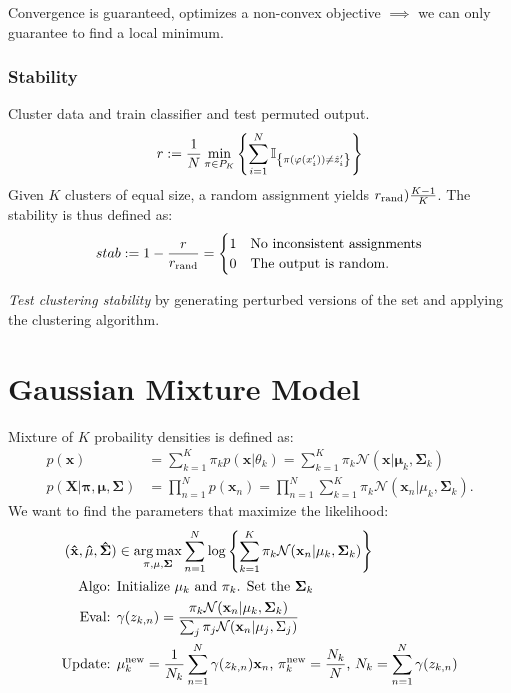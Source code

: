 \documentclass[a4paper,11pt,landscape]{article}
\renewcommand{\phi}{\varphi}
\newcommand{\argmax}{\operatorname*{arg\,max}}
\newcommand{\sectionline}{\noindent\makebox[\linewidth]{\rule{\columnwidth}{0.1pt}}}
\newcommand{\msection}[1]{\vspace{-1mm}\sectionline\vspace{-1mm}\section{#1}\vspace{-1mm}}
\begin{document}
\begin{multicols}{3}
\begin{enumerate}
\end{enumerate}

Convergence is guaranteed, optimizes a non-convex objective $\implies$ we can only guarantee to find a local minimum.

\subsubsection{Stability}
Cluster data and train classifier and test permuted output.
\[
 r := {1 \over N} \min_{\pi \in P_K} \left\{ \sum_{i=1}^N \mathbb{I}_{
    \left\{ \pi (\phi (x_i')) \neq \hat{z}_i' \right\}
  } \right\}
\]
Given $K$ clusters of equal size, a random assignment yields $r_{\text{rand}}) {K-1 \over K}$. The stability is thus defined as:
\[
 stab := 1 - {r \over r_{\text{rand}}} =
  \begin{cases}
   1 & \text{No inconsistent assignments}\\
   0 & \text{The output is random.}
  \end{cases}
\]


\emph{Test clustering stability} by generating perturbed versions of the set and applying the clustering algorithm.
\msection{Gaussian Mixture Model}
Mixture of $K$ probaility densities is defined as:
\begin{align*}
 p(\mathbf x) &= \sum_{k=1}^K \pi_k p(\mathbf x | \theta_k) = \sum_{k=1}^K \pi_k \mathcal N(\mathbf x | \mathbf \mu_k, \mathbf \Sigma_k)\\
 p(\mathbf X | \mathbf \pi, \mathbf\mu, \mathbf\Sigma) &= \prod_{n=1}^N p(\mathbf x_n) = \prod_{n=1}^N \sum_{k=1}^K \pi_k \mathcal N(\mathbf x_n| \mu_k, \mathbf \Sigma_k).
\end{align*}
We want to find the parameters that maximize the likelihood:
\begin{align*}
 (\mathbf{\hat x}, \mathbf{\hat \mu }, \mathbf{\hat \Sigma}) &\in \argmax_{\mathbf \pi, \mathbf \mu, \mathbf \Sigma} \sum_{n=1}^N \log \left\{ \sum_{k=1}^K  \pi_k \mathcal N (\mathbf x_n | \mathbf \mu_k, \mathbf \Sigma_k) \right\}\\
 \text{Algo: }& \text{Initialize }\mathbf \mu_k \text{ and }\mathbf \pi_k \text{. Set the }\mathbf \Sigma_k\\
  \text{Eval: }&\gamma(z_{k, n}) = {\pi_k \mathcal N(\mathbf x_n | \mathbf \mu_k, \mathbf \Sigma_k) \over \sum_j \pi_j \mathcal N(\mathbf x_n | \mathbf \mu_j, \Sigma_j)}\\
  \text{Update: }&\mathbf \mu_k^\text{new} = {1\over N_k} \sum_{n=1}^N \gamma(z_{k,n})\mathbf x_n\text{, }
  \pi_k^{\text{new}} = {N_k\over N} \text{, } N_k = \sum_{n=1}^N \gamma(z_{k,n})
\end{align*}




\end{multicols}
\end{document}
